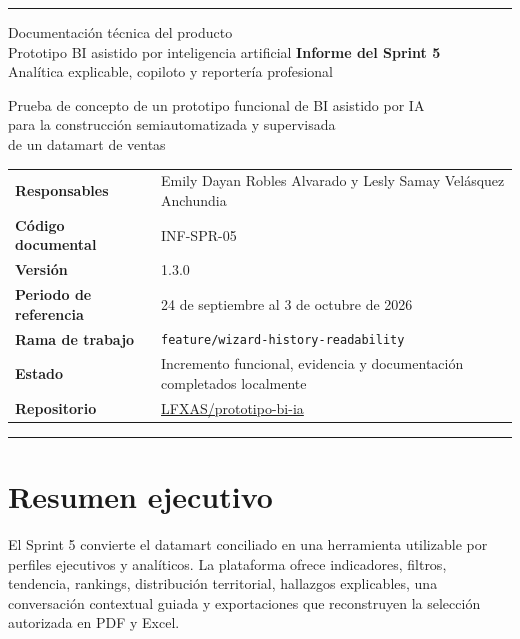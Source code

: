 \documentclass[11pt,letterpaper]{article}
\newcommand{\file}[1]{\texttt{#1}}
\begin{document}
\hypersetup{pageanchor=false}
\begin{titlepage}
  \thispagestyle{empty}
  \vspace*{0.8cm}
  {\color{ugblue}\rule{\textwidth}{2.8pt}}
  \vspace{1.2cm}
  {\Large Documentación técnica del producto\\[0.25em]
  Prototipo BI asistido por inteligencia artificial}
  \vfill
  {\color{deepgreen}\fontsize{28}{34}\selectfont\textbf{Informe del Sprint 5}}\\[0.7em]
  {\LARGE Analítica explicable, copiloto y reportería profesional}\\[0.6em]
  {\large Prueba de concepto de un prototipo funcional de BI asistido por IA\\
  para la construcción semiautomatizada y supervisada\\
  de un datamart de ventas\par}
  \vspace{1.4cm}
  \begin{tabularx}{\textwidth}{@{}>{\bfseries}l X@{}}
    Responsables & Emily Dayan Robles Alvarado y Lesly Samay Velásquez Anchundia \\
    Código documental & INF-SPR-05 \\
    Versión & 1.3.0 \\
    Periodo de referencia & 24 de septiembre al 3 de octubre de 2026 \\
    Rama de trabajo & \file{feature/wizard-history-readability} \\
    Estado & Incremento funcional, evidencia y documentación completados localmente \\
    Repositorio & \href{https://github.com/LFXAS/prototipo-bi-ia}{LFXAS/prototipo-bi-ia} \\
  \end{tabularx}
  \vfill
  {\color{ugblue}\rule{\textwidth}{2.8pt}}
\end{titlepage}
\hypersetup{pageanchor=true}
\tableofcontents
\newpage
{}

\section{Resumen ejecutivo}

El Sprint 5 convierte el datamart conciliado en una herramienta utilizable por perfiles ejecutivos y analíticos. La plataforma ofrece indicadores, filtros, tendencia, rankings, distribución territorial, hallazgos explicables, una conversación contextual guiada y exportaciones que reconstruyen la selección autorizada en PDF y Excel.
\end{document}
